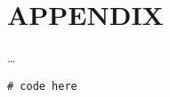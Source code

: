 \newpage

\section{APPENDIX} \label{sec:appendix}

    \ldots


    \begin{lstlisting}[caption={Snipped name}, label={lst:}]
        # code here
    \end{lstlisting}